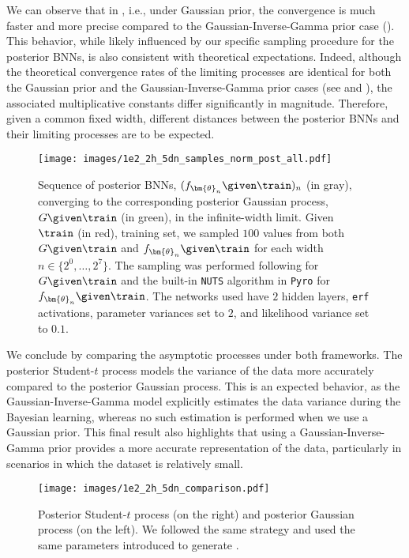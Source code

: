 \begin{remark}
    We can observe that in , i.e., under Gaussian prior, the convergence is much faster and more precise compared to the Gaussian-Inverse-Gamma prior case (). 
    This behavior, while likely influenced by our specific sampling procedure for the posterior BNNs, is also consistent with theoretical expectations.
    Indeed, although the theoretical convergence rates of the limiting processes are identical for both the Gaussian prior and the Gaussian-Inverse-Gamma prior cases (see  and ), the associated multiplicative constants differ significantly in magnitude. 
    Therefore, given a common fixed width, different distances between the posterior BNNs and their limiting processes are to be expected.
\end{remark}

\begin{figure}
    \centering
    \texttt{[image: images/1e2\_2h\_5dn\_samples\_norm\_post\_all.pdf]}
    \captionsetup{width = .95\textwidth, font = small, skip = 2pt}
    \caption{%
        Sequence of posterior BNNs, \textcolor{plotgray}{$(f_{\bm{\theta}_n} \given \train)_n$} (in gray), converging to the corresponding posterior Gaussian process, \textcolor{plotgreen}{$G \given \train$} (in green), in the infinite-width limit. 
        Given \textcolor{plotred}{$\train$} (in red), training set, we sampled $100$ values from both $G \given \train$ and $f_{\bm{\theta}_n} \given \train$ for each width $n \in \{2^0, \dots, 2^7\}$. 
        The sampling was performed following \citet[eqs. (2.22)-(2.24)]{gp2006} for $G \given \train$ and the built-in \texttt{NUTS} algorithm in \texttt{Pyro} for $f_{\bm{\theta}_n} \given \train$. 
        The networks used have $2$ hidden layers, \texttt{erf} activations, parameter variances set to $2$, and likelihood variance set to $0.1$.
    }
    \label{fig:gaussianprior}
\end{figure}

We conclude by comparing the asymptotic processes under both frameworks.
The posterior Student-$t$ process models the variance of the data more accurately compared to the posterior Gaussian process.
This is an expected behavior, as the Gaussian-Inverse-Gamma model explicitly estimates the data variance during the Bayesian learning, whereas no such estimation is performed when we use a Gaussian prior.
This final result also highlights that using a Gaussian-Inverse-Gamma prior provides a more accurate representation of the data, particularly in scenarios in which the dataset is relatively small.

\begin{figure}
    \centering
    \texttt{[image: images/1e2\_2h\_5dn\_comparison.pdf]}
    \captionsetup{width = .9\textwidth, font = small, skip = 2pt}
    \caption{%
        Posterior Student-$t$ process (on the right) and posterior Gaussian process (on the left). 
        We followed the same strategy and used the same parameters introduced to generate .
    }
    \label{fig:comparison}
\end{figure}
